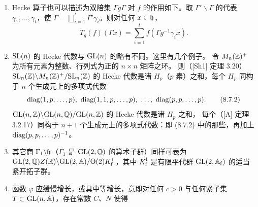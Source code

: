 \begin{enumerate}[label=\arabic*., leftmargin=1.9em, itemsep=1.2pt, topsep=2pt]
都唯一地延拓为自守因子 $J$，取 $J(g,hx_0)=j(gh)j(h)^{-1}$。
若 $E$ 的自守因子存在，它决定 $E$ 的一个光滑平凡化 $\Phi_J:G\times_KV\to D\times V$，$[g,v]\mapsto(gK,J(g,x_0)v)$，
它关于 $D\times V$ 上的 $J$-自守 $G$ 作用 $g\cdot(x,v)=(gx,J(g,x)v)$ 是 $G$-等变的。
（反之，$E$ 的任何光滑平凡化 $\Psi:E\to D\times V$ 决定唯一的自守因子 $J$ 使 $\Psi=\Phi_J$。）
自守因子使人能把光滑映射 $f:D\to V$ 与 $E$ 的光滑截面 $\tilde f:G\to V$ 等同起来，取 $\tilde f(g)=J(g,x_0)^{-1}f(gK)$。
在某些 $\gamma\in G$ 下不变（即 $\tilde f(\gamma g)=\tilde f(g)$ 对一切 $g\in G$）的截面 $\tilde f$，
就对应于满足 $f(\gamma x)=J(\gamma,x)f(x)$（对一切 $x\in D$）的映射 $f:D\to V$。
在 $\sL(2)$ 的情形，$K=\sO(2)$ 的一维表示
\[
\rho\begin{pmatrix}a&b\\-b&a\end{pmatrix}=(a+ib)^k
\]
有自守因子 $J\!\left(\bigl(\begin{smallmatrix}a&b\\c&d\end{smallmatrix}\bigr),z\right)=(cz+d)^k$，其中 $z\in\he=G/K$。更多细节见 [GP]。
\item Hecke 算子也可以描述为双陪集 $\Gamma g\Gamma$ 对 $f$ 的作用如下。取 $\Gamma'\backslash\Gamma$ 的代表 $\gamma_1,\dots,\gamma_t$，使 $\Gamma=\bigsqcup_{i=1}^{t}\Gamma'\gamma_i$。则对任何 $x\in\mathfrak{h}$，
\begin{equation*}
T_g(f)(\Gamma x)=\sum_{i=1}^{t}f(\Gamma g^{-1}\gamma_ix).
\tag{8.7.1}
\end{equation*}
\item $\mathrm{SL}(n)$ 的 Hecke 代数与 $\mathrm{GL}(n)$ 的略有不同。这里有几个例子。
令 $M_n(\mathbb{Z})^+$ 为所有元素为整数、行列式为正的 $n\times n$ 矩阵之环。
则（[Sh1] 定理 3.20）$\mathrm{SL}_n(\mathbb{Z})\backslash M_n(\mathbb{Z})^+/\mathrm{SL}_n(\mathbb{Z})$ 的 Hecke 代数是诸 $H_p$（$p$ 素）之和，每个 $H_p$ 同构于 $n$ 个生成元上的多项式代数
\begin{equation*}
\diag(1,p,\dots,p),\ \diag(1,1,p,\dots,p),\ \dots,\ \diag(p,p,\dots,p).
\tag{8.7.2}
\end{equation*}
$\mathrm{GL}(n,\mathbb{Z})\backslash\mathrm{GL}(n,\mathbb{Q})/\mathrm{GL}(n,\mathbb{Z})$ 的 Hecke 代数是诸 $H_p$ 之和，
每个（[A] 定理 3.2.17）同构于 $n+1$ 个生成元上的多项式代数：即 (8.7.2) 中的那些，再加上 $\mathrm{diag}(p,p,\dots,p)^{-1}$。
\item 其它商 $\Gamma_1\backslash\mathfrak{h}$（$\Gamma_1$ 是 $\mathrm{GL}(2,\mathbb{Q})$ 的算术子群）同样可表为
$\mathrm{GL}(2,\mathbb{Q})Z(\mathbb{R})\backslash\mathrm{GL}(2,\mathbb{A})/\mathrm{O}(2)K^1_{\mathrm f}$，其中 $K^1_{\mathrm f}$ 是有限平代群 $\mathrm{GL}(2,\mathbb{A}_{\mathrm f})$ 的适当紧开拓子群。
\item 函数 $\varphi$ 应缓慢增长，或具中等增长，意即对任何 $c>0$ 与任何紧子集 $T\subset\mathrm{GL}(n,\mathbb{A})$，存在常数 $C$、$N$ 使得

\end{enumerate}
